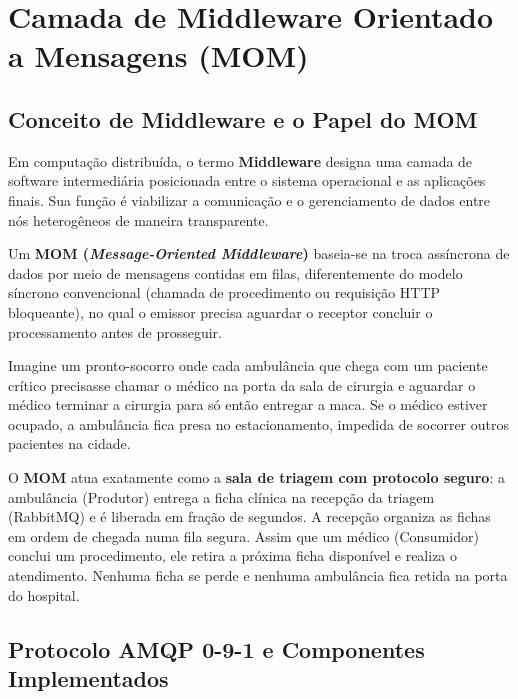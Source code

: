 \documentclass[11pt,a4paper]{article}
\begin{document}
\section{Camada de Middleware Orientado a Mensagens (MOM)}

\subsection{Conceito de Middleware e o Papel do MOM}

Em computação distribuída, o termo \textbf{Middleware} designa uma camada de software intermediária posicionada entre o sistema operacional e as aplicações finais. Sua função é viabilizar a comunicação e o gerenciamento de dados entre nós heterogêneos de maneira transparente.

Um \textbf{MOM (\textit{Message-Oriented Middleware})} baseia-se na troca assíncrona de dados por meio de mensagens contidas em filas, diferentemente do modelo síncrono convencional (chamada de procedimento ou requisição HTTP bloqueante), no qual o emissor precisa aguardar o receptor concluir o processamento antes de prosseguir.

\begin{analogia}
Imagine um pronto-socorro onde cada ambulância que chega com um paciente crítico precisasse chamar o médico na porta da sala de cirurgia e aguardar o médico terminar a cirurgia para só então entregar a maca. Se o médico estiver ocupado, a ambulância fica presa no estacionamento, impedida de socorrer outros pacientes na cidade.

O \textbf{MOM} atua exatamente como a \textbf{sala de triagem com protocolo seguro}: a ambulância (Produtor) entrega a ficha clínica na recepção da triagem (RabbitMQ) e é liberada em fração de segundos. A recepção organiza as fichas em ordem de chegada numa fila segura. Assim que um médico (Consumidor) conclui um procedimento, ele retira a próxima ficha disponível e realiza o atendimento. Nenhuma ficha se perde e nenhuma ambulância fica retida na porta do hospital.
\end{analogia}

\subsection{Protocolo AMQP 0-9-1 e Componentes Implementados}
\end{document}
